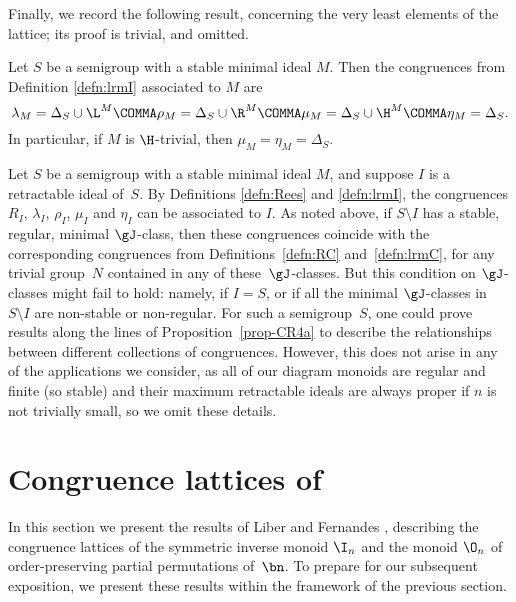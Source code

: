 Finally, we record the following result, concerning the very least elements of
the lattice; its proof is trivial, and omitted.

\begin{proposition}
\label{prop-CR5}
Let $S$ be a semigroup with a stable minimal ideal $M$.  Then the congruences from Definition \ref{defn:lrmI} associated to $M$ are
\[
\lambda_M = \Delta_S\cup {\L^M} \COMMA
\rho_M = \Delta_S\cup {\R^M} \COMMA
\mu_M = \Delta_S\cup {\H^M} \COMMA
\eta_M = \Delta_S.
\]
  In particular, if $M$ is $\H$-trivial, then $\mu_M=\eta_M=\Delta_S$.
  \epfres
\end{proposition}

\begin{rem}
Let $S$ be a semigroup with a stable minimal ideal $M$, and suppose $I$ is a retractable ideal of~$S$.  By Definitions \ref{defn:Rees} and \ref{defn:lrmI}, the congruences $R_I$, $\lambda_I$, $\rho_I$, $\mu_I$ and $\eta_I$ can be associated to $I$.  As noted above, if $S\setminus I$ has a stable, regular, minimal $\gJ$-class, then these congruences coincide with the corresponding congruences from Definitions~\ref{defn:RC} and~\ref{defn:lrmC}, for any trivial group~$N$ contained in any of these~$\gJ$-classes.  But this condition on $\gJ$-classes might fail to hold: namely, if $I=S$, or if all the minimal $\gJ$-classes in~$S\setminus I$ are non-stable or non-regular.  For such a semigroup~$S$, one could prove results along the lines of Proposition~\ref{prop-CR4a} to describe the relationships between different collections of congruences.  However, this does not arise in any of the applications we consider, as all of our diagram monoids are regular and finite (so stable) and their maximum retractable ideals are always proper if $n$ is not trivially small, so we omit these details.
\end{rem}

\section{Congruence lattices of }
\label{sec:SnInOn}

In this section we present the results of Liber \cite{Liber1953} and Fernandes
\cite{Fernandes2001}, describing the congruence lattices of the symmetric
inverse monoid $\I_n$ and the monoid $\O_n$ of order-preserving
partial permutations of~$\bn$.  To prepare for our subsequent exposition, we
present these results within the framework of the previous section.

